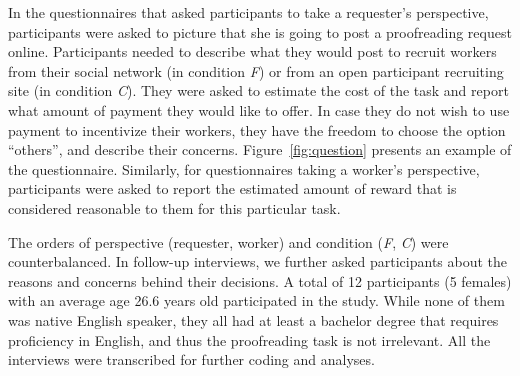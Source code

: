 In the questionnaires that asked participants to take a requester's perspective, 
participants were asked to picture that she is going to post a proofreading request online. 
Participants needed to describe what they would post to recruit workers from their social network (in condition \emph{F}) 
or from an open participant recruiting site (in condition \emph{C}). 
They were asked to estimate the cost of the task and report what amount of payment they would like to offer. 
In case they do not wish to use payment to incentivize their workers, 
they have the freedom to choose the option ``others'', and describe their concerns.  
Figure~\ref{fig:question} presents an example of the questionnaire. 
Similarly, for questionnaires taking a worker's perspective, 
participants were asked to report the estimated amount of reward that is considered reasonable to them for this particular task.

The orders of perspective (requester, worker) and condition (\emph{F}, \emph{C}) were counterbalanced. 
In follow-up interviews, we further asked participants about the reasons and concerns behind their decisions. 
A total of 12 participants (5 females) with an average age 26.6 years old participated in the study. 
While none of them was native English speaker, they all had at least a bachelor degree that requires proficiency in English, 
and thus the proofreading task is not irrelevant. 
All the interviews were transcribed for further coding and analyses.



